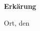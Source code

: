 
{\Large \textbf{Erkärung}}

\vspace{1cm}

\makeatletter
Ort, den {\@date}

\vspace{2.5cm}
\@author
\makeatother